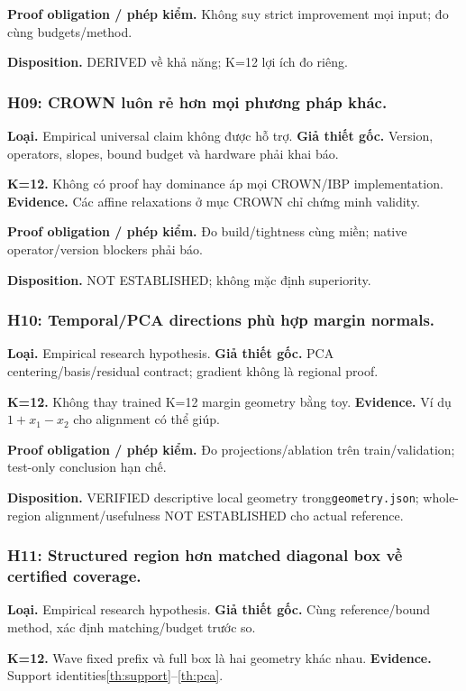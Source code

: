 \documentclass[11pt,a4paper]{article}
\newcommand{\code}[1]{{\small\ttfamily\nolinkurl{#1}}}
\theoremstyle{remark}
\begin{document}
\textbf{Proof obligation / phép kiểm.} Không suy strict improvement mọi input; đo cùng budgets/method.

\textbf{Disposition.} DERIVED về khả năng; K=12 lợi ích đo riêng.

\subsubsection*{H09: CROWN luôn rẻ hơn mọi phương pháp khác.}
\textbf{Loại.} Empirical universal claim không được hỗ trợ. \textbf{Giả thiết gốc.} Version, operators, slopes, bound budget và hardware phải khai báo.

\textbf{K=12.} Không có proof hay dominance áp mọi CROWN/IBP implementation. \textbf{Evidence.} Các affine relaxations ở mục CROWN chỉ chứng minh validity.

\textbf{Proof obligation / phép kiểm.} Đo build/tightness cùng miền; native operator/version blockers phải báo.

\textbf{Disposition.} NOT ESTABLISHED; không mặc định superiority.

\subsubsection*{H10: Temporal/PCA directions phù hợp margin normals.}
\textbf{Loại.} Empirical research hypothesis. \textbf{Giả thiết gốc.} PCA centering/basis/residual contract; gradient không là regional proof.

\textbf{K=12.} Không thay trained K=12 margin geometry bằng toy. \textbf{Evidence.} Ví dụ $1+x_1-x_2$ cho alignment có thể giúp.

\textbf{Proof obligation / phép kiểm.} Đo projections/ablation trên train/validation; test-only conclusion hạn chế.

\textbf{Disposition.} VERIFIED descriptive local geometry trong\code{geometry.json}; whole-region alignment/usefulness NOT ESTABLISHED cho actual reference.

\subsubsection*{H11: Structured region hơn matched diagonal box về certified coverage.}
\textbf{Loại.} Empirical research hypothesis. \textbf{Giả thiết gốc.} Cùng reference/bound method, xác định matching/budget trước so.

\textbf{K=12.} Wave fixed prefix và full box là hai geometry khác nhau. \textbf{Evidence.} Support identities\ref{th:support}--\ref{th:pca}.
\end{document}
